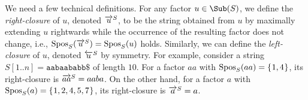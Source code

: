 \documentclass{article}
\begin{document}
We need a few technical definitions. 
For any factor $u \in \Sub(S)$, we define the \textit{right-closure} of $u$, denoted $\overrightarrow{u}^{S}$, to be the string obtained from $u$ by maximally extending $u$ rightwards while the occurrence of the resulting factor does not change, i.e., $\mathrm{Spos}_{S}(\overrightarrow{u}^{S}) = \mathrm{Spos}_{S}(u)$ holds.
Similarly, we can define the \textit{left-closure} of $u$, denoted $\overleftarrow{u}^{S}$ by symmetry. 
For example, consider a string  $S[1..n] = \mathtt{aabaababb\$}$ of length $10$. For a factor $aa$ with $\mathrm{Spos}_{S}(aa) = \{\kern0.05em1, 4\kern0.05em\}$, its right-closure is $\overrightarrow{aa}^{S} = aaba$. On the other hand, for a factor $a$ with $\mathrm{Spos}_{S}(a) = \{\kern0.05em1,2,4,5,7\kern0.05em\}$, its right-closure is $\overrightarrow{a}^{S} = a$. 


\end{document}
